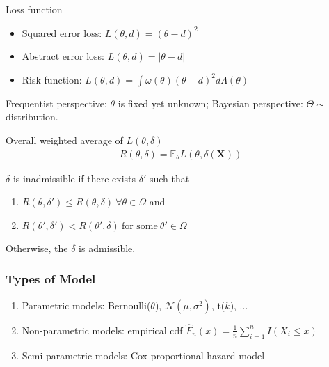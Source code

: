 Loss function
\begin{itemize}
    \item Squared error loss: $L(\theta,d)=(\theta-d)^2$
    \item Abstract error loss: $L(\theta,d)=|\theta-d|$
    \item Risk function: 
    $L(\theta,d)=\int{\omega(\theta)(\theta-d)^2d\Lambda(\theta)}$
\end{itemize}

Frequentist perspective: $\theta$ is fixed yet unknown;
Bayesian perspective: $\Theta\sim$ distribution.

\begin{definition}
    Overall weighted average of $L(\theta,\delta)$
    \begin{gather}
        R(\theta, \delta)=\mathbb{E}_\theta L(\theta, \delta(\boldsymbol{X}))
    \end{gather}
\end{definition}

\begin{definition}[Admissibility]
\label{def:admissible}
    $\delta$ is inadmissible if there exists $\delta'$ such that 
    \begin{enumerate}[{(1)}]
        \item $R(\theta, \delta') \leq R(\theta, \delta)~\forall{\theta}\in\Omega$ and 
        \item $R(\theta', \delta') < R(\theta', \delta)~\text{for some}~\theta'\in\Omega$
    \end{enumerate}
    Otherwise, the $\delta$ is admissible.
\end{definition}

\subsubsection{Types of Model}
\begin{enumerate}
    \item Parametric models: Bernoulli($\theta$), $\mathcal{N}(\mu,\sigma^2)$, t($k$), ...
    \item Non-parametric models: empirical cdf $\hat{F}_n(x)=\frac{1}{n}\sum_{i=1}^n{I(X_i\leq{x})}$
    \item Semi-parametric models: Cox proportional hazard model
        
\end{enumerate}


